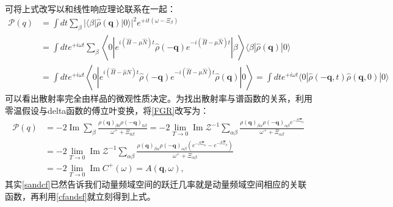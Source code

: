 \documentclass[10pt,openany]{book}
\theoremstyle{thmstyle} %
\theoremstyle{defstyle} %
\theoremstyle{prostyle} %
\begin{document}
可将上式改写以和线性响应理论联系在一起：
\begin{equation}
  \begin{aligned}
    \mathcal{P}(q) & =\int d t \sum_\beta|\langle\beta|\hat{\rho}(\mathbf{q})| 0\rangle|^2 e^{+i t\left(\omega-\Xi_\beta\right)} \\
    & =\int d t e^{+i \omega t} \sum_\beta\left\langle 0\left|e^{i(\hat{H}-\mu \hat{N}) t} \hat{\rho}(-\mathbf{q}) e^{-i(\hat{H}-\mu \hat{N}) t}\right| \beta\right\rangle\langle\beta|\hat{\rho}(\mathbf{q})| 0\rangle \\
    & =\int d t e^{+i \omega t}\left\langle 0\left|e^{i(\hat{H}-\hat{\mu} N) t} \hat{\rho}(-\mathbf{q}) e^{-i(\hat{H}-\mu \hat{N}) t} \hat{\rho}(\mathbf{q})\right| 0\right\rangle=\int d t e^{+i \omega t}\langle 0|\hat{\rho}(-\mathbf{q}, t) \hat{\rho}(\mathbf{q}, 0)| 0\rangle
    \end{aligned}
  \label{sandcf}
\end{equation}
可以看出散射率完全由样品的微观性质决定。为找出散射率与谱函数的关系，利用零温假设与delta函数的傅立叶变换，将\eqref{FGR}改写为：
\begin{equation}
  \begin{aligned}
    \mathcal{P}(q) & =-2 \operatorname{Im} \sum_\beta \frac{\rho(\mathbf{q})_{\beta 0} \rho(-\mathbf{q})_{0 \beta}}{\omega^{+}+\Xi_{0 \beta}}=-2 \lim _{T \rightarrow 0} \operatorname{Im} \mathcal{Z}^{-1} \sum_{\alpha \beta} \frac{\rho(\mathbf{q})_{\beta \alpha} \rho(-\mathbf{q})_{\alpha \beta} e^{-\beta \Xi_\alpha}}{\omega^{+}+\Xi_{\alpha \beta}} \\
    & =-2 \lim _{T \rightarrow 0} \operatorname{Im} \mathcal{Z}^{-1} \sum_{\alpha \beta} \frac{\rho(\mathbf{q})_{\beta \alpha} \rho(-\mathbf{q})_{\alpha \beta}\left(e^{-\beta \Xi_\alpha}-e^{-\beta \Xi_\beta}\right)}{\omega^{+}+\Xi_{\alpha \beta}} \\
    & =-2 \lim _{T \rightarrow 0} \operatorname{Im} C^{+}(\omega)=A(\mathbf{q}, \omega),
    \end{aligned}
\end{equation}
其实\eqref{sandcf}已然告诉我们动量频域空间的跃迁几率就是动量频域空间相应的关联函数，再利用\eqref{cfandsf}就立刻得到上式。
\end{document}
